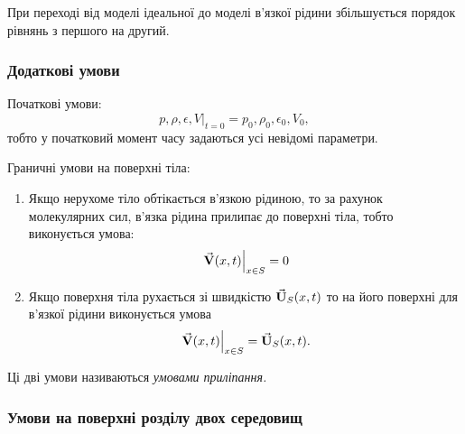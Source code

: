 \begin{remark}
	При переході від моделі ідеальної до моделі в'язкої рідини збільшується порядок рівнянь з першого на другий.
\end{remark}

\subsubsection{Додаткові умови}

Початкові умови:
\begin{equation}
	\left. p, \rho, \epsilon, V \right|_{t = 0} = p_0, \rho_0, \epsilon_0, V_0,
\end{equation}
тобто у початковий момент часу задаються усі невідомі параметри. \medskip

Граничні умови на поверхні тіла:
\begin{enumerate}
	\item Якщо нерухоме тіло обтікається в'язкою рідиною, то за рахунок молекулярних сил, в'язка рідина прилипає до поверхні тіла, тобто виконується умова:
	\begin{equation}
		\left. {\vec{\mathbf{V}}}(x, t) \right|_{x \in S} = 0
	\end{equation}
	\item Якщо поверхня тіла рухається зі швидкістю  ${\vec{\mathbf{U}}}_S(x, t)$ то на його поверхні для в'язкої рідини виконується умова
	\begin{equation}
		\left. {\vec{\mathbf{V}}}(x, t) \right|_{x \in S} = {\vec{\mathbf{U}}}_S(x, t).
	\end{equation}
\end{enumerate}

\begin{definition}
	Ці дві умови називаються \it{умовами приліпання}.
\end{definition}

\subsubsection{Умови на поверхні розділу двох середовищ}

